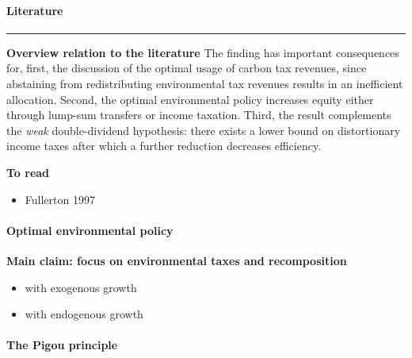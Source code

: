 \paragraph{Literature}




\hrule



\textbf{Overview relation to the literature}
	The finding has important consequences for, first, the discussion of the optimal usage of carbon tax revenues, since abstaining from redistributing environmental tax revenues results in an inefficient allocation. Second, the optimal environmental policy increases equity either through lump-sum transfers or income taxation. Third, the result complements the \textit{weak} double-dividend hypothesis: there exists a lower bound on distortionary income taxes after which a further reduction decreases efficiency.

\textbf{To read}
\begin{itemize}
	\item Fullerton 1997
\end{itemize}
\paragraph{Optimal environmental policy}
\textbf{Main claim: focus on environmental taxes and recomposition}
\begin{itemize}
	\item with exogenous growth
	\item with endogenous growth
\end{itemize}


\paragraph{The Pigou principle }


